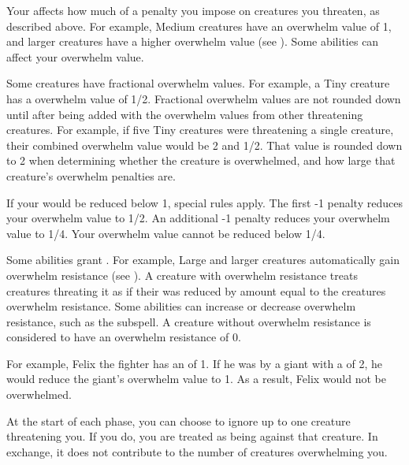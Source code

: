             \label{Overwhelm Value} Your  affects how much of a penalty you impose on creatures you threaten, as described above.
            For example, Medium creatures have an overwhelm value of 1, and larger creatures have a higher overwhelm value (see ).
            Some abilities can affect your overwhelm value.

            Some creatures have fractional overwhelm values.
            For example, a Tiny creature has a overwhelm value of 1/2.
            Fractional overwhelm values are not rounded down until after being added with the overwhelm values from other threatening creatures.
            For example, if five Tiny creatures were threatening a single creature, their combined overwhelm value would be 2 and 1/2.
            That value is rounded down to 2 when determining whether the creature is overwhelmed, and how large that creature's overwhelm penalties are.

            If your  would be reduced below 1, special rules apply.
            The first -1 penalty reduces your overwhelm value to 1/2.
            An additional -1 penalty reduces your overwhelm value to 1/4.
            Your overwhelm value cannot be reduced below 1/4.

            \label{Overwhelm Resistance} Some abilities grant .
            For example, Large and larger creatures automatically gain overwhelm resistance (see ).
            A creature with overwhelm resistance treats creatures threating it as if their  was reduced by amount equal to the creatures overwhelm resistance.
            Some abilities can increase or decrease overwhelm resistance, such as the  subspell.
            A creature without overwhelm resistance is considered to have an overwhelm resistance of 0.

            For example, Felix the fighter has an  of 1.
            If he was  by a giant with a  of 2, he would reduce the giant's overwhelm value to 1.
            As a result, Felix would not be overwhelmed.

             At the start of each phase, you can choose to ignore up to one creature threatening you.
            If you do, you are treated as being \unaware against that creature.
            In exchange, it does not contribute to the number of creatures overwhelming you.

